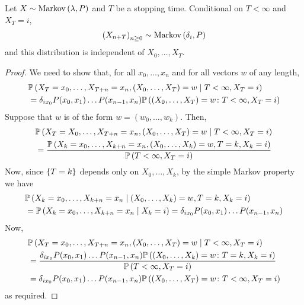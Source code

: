 \begin{theorem}
	Let $X \sim \operatorname{Markov}\left({\lambda, P}\right)$ and $T$ be a stopping time.
	Conditional on $T < \infty$ and $X_T = i$,
	\begin{align*}
		\qty(X_{n + T})_{n \geq 0} \sim \operatorname{Markov}\left({\delta_i, P}\right)
	\end{align*}
	and this distribution is independent of $X_0, \dots, X_T$.
\end{theorem}
\begin{proof}
	We need to show that, for all $x_0, \dots, x_n$ and for all vectors $w$ of any length,
	\begin{align*}
		 & \mathbb{P}\left({X_T = x_0, \dots, X_{T+n} = x_n, (X_0, \dots, X_T) = w \mid T < \infty, X_T = i}\right)                    \\
		 & = \delta_{i x_0} P(x_0,x_1) \dots P(x_{n-1}, x_n) \mathbb{P}\left({(X_0, \dots, X_T) = w \colon T < \infty, X_T = i}\right)
	\end{align*}
	Suppose that $w$ is of the form $w = (w_0, \dots, w_k)$.
	Then,
	\begin{align*}
		 & \mathbb{P}\left({X_T = X_0, \dots, X_{T+n} = x_n, (X_0, \dots, X_T) = w \mid T < \infty, X_T = i}\right)                      \\
		 & = \frac{\mathbb{P}\left({X_k = x_0, \dots, X_{k+n} = x_n, (X_0, \dots, X_k)=w, T=k,X_k=i}\right)}{\mathbb{P}\left({T < \infty, X_T = i}\right)}
	\end{align*}
	Now, since $\qty{T=k}$ depends only on $X_0, \dots, X_k$, by the simple Markov property we have
	\begin{align*}
		 & \mathbb{P}\left({X_k = x_0, \dots, X_{k+n} = x_n \mid (X_0, \dots, X_k) = w, T = k, X_k = i}\right)                        \\
		 & = \mathbb{P}\left({X_k = x_0, \dots, X_{k+n} = x_n \mid X_k = i}\right) = \delta_{i x_0} P(x_0, x_1) \dots P(x_{n-1}, x_n)
	\end{align*}
	Now,
	\begin{align*}
		 & \mathbb{P}\left({X_T = x_0, \dots, X_{T+n} = x_n, (X_0, \dots, X_T) = w \mid T < \infty, X_T = i}\right)                                                  \\
		 & = \frac{\delta_{i x_0} P(x_0,x_1) \dots P(x_{n-1}, x_n) \mathbb{P}\left({(X_0, \dots, X_k) = w \colon T = k, X_k = i}\right)}{\mathbb{P}\left({T < \infty, X_T = i}\right)} \\
		 & = \delta_{i x_0} P(x_0,x_1) \dots P(x_{n-1}, x_n) \mathbb{P}\left({(X_0, \dots, X_T) = w \colon T < \infty, X_T = i}\right)
	\end{align*}
	as required.
\end{proof}
